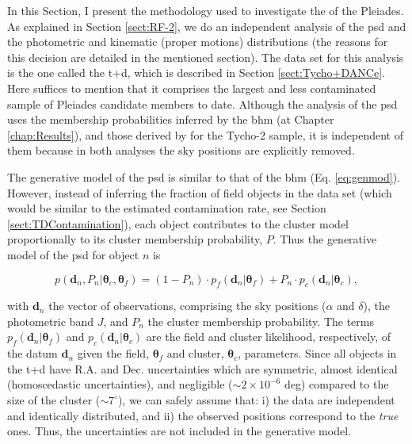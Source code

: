 In this Section, I present the methodology used to investigate the  of the Pleiades. As explained in Section \ref{sect:RF-2}, we do an independent analysis of the \gls{psd} and the photometric and kinematic (proper motions) distributions (the reasons for this decision are detailed in the mentioned section). The data set for this analysis is the one called the \gls{t+d}, which is described in Section \ref{sect:Tycho+DANCe}. Here suffices to mention that it comprises the largest and less contaminated sample of Pleiades candidate members to date.  Although the analysis of the \gls{psd} uses the membership probabilities inferred by the \gls{bhm} (at Chapter \ref{chap:Results}), and those derived by \citet{Bouy2015} for the Tycho-2 sample, it is independent of them because in both analyses the sky positions are explicitly removed. 

The generative model of the \gls{psd} is similar to that of the \gls{bhm}  (Eq. \ref{eq:genmod}). However, instead of inferring the fraction of field objects in the data set (which would be similar to the estimated contamination rate, see Section \ref{sect:TDContamination}), each object contributes to the cluster model proportionally to its cluster membership probability, $P$. Thus the generative model of the \gls{psd} for object $n$ is

\begin{equation}
\label{eq:genmodPSD}
p(\mathbf{d}_n,P_n |\boldsymbol{\theta}_c,\boldsymbol{\theta}_f)=(1-P_n) \cdot p_f(\mathbf{d}_n|\boldsymbol{\theta}_f) + P_n\cdot p_c(\mathbf{d}_n| \boldsymbol{\theta}_c),
\end{equation}

with $\mathbf{d}_n$ the vector of observations, comprising the sky positions ($\alpha$ and $\delta$), the photometric band $J$, and $P_n$  the cluster membership probability. The terms $p_f(\mathbf{d}_n|\boldsymbol{\theta}_f)$ and $p_c(\mathbf{d}_n|\boldsymbol{\theta}_c)$ are the field and cluster likelihood, respectively, of the datum $\mathbf{d}_n$ given the field, $\boldsymbol{\theta}_f$ and cluster, $\boldsymbol{\theta}_c$, parameters. Since all objects in the \gls{t+d} have R.A. and Dec. uncertainties which are symmetric, almost identical (homoscedastic uncertainties), and negligible ($\sim 2\times10^{-6}$ deg) compared to the size of the cluster ($\sim7^{\circ}$), we can safely assume that: i) the data are independent and identically distributed, and ii) the observed positions correspond to the \emph{true} ones. Thus, the uncertainties are not included in the generative model. 

